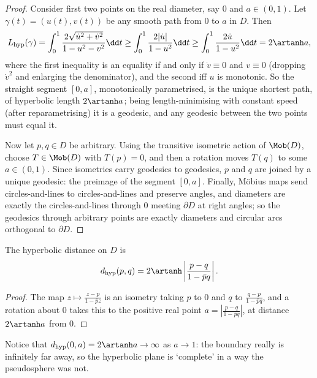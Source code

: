 \begin{proof}
    Consider first two points on the real diameter, say $0$ and $a \in (0, 1)$. Let $\gamma(t) = (u(t), v(t))$ be any smooth path from $0$ to $a$ in $D$. Then
    \begin{align*}
    L_{\mathrm{hyp}}(\gamma) = \int_0^1 \frac{2\sqrt{\dot u^2 + \dot v^2}}{1 - u^2 - v^2} \dd t \geq \int_0^1 \frac{2 |\dot u|}{1 - u^2} \dd t \geq \int_0^1 \frac{2 \dot u}{1 - u^2} \dd t = 2 \artanh a,
    \end{align*}
    where the first inequality is an equality if and only if $\dot v \equiv 0$ and $v \equiv 0$ (dropping $\dot v^2$ and enlarging the denominator), and the second iff $u$ is monotonic. So the straight segment $[0, a]$, monotonically parametrised, is the unique shortest path, of hyperbolic length $2 \artanh a$; being length-minimising with constant speed (after reparametrising) it is a geodesic, and any geodesic between the two points must equal it.

    Now let $p, q \in D$ be arbitrary. Using the transitive isometric action of $\Mob(D)$, choose $T \in \Mob(D)$ with $T(p) = 0$, and then a rotation moves $T(q)$ to some $a \in (0, 1)$. Since isometries carry geodesics to geodesics, $p$ and $q$ are joined by a unique geodesic: the preimage of the segment $[0, a]$. Finally, M\"obius maps send circles-and-lines to circles-and-lines and preserve angles, and diameters are exactly the circles-and-lines through $0$ meeting $\partial D$ at right angles; so the geodesics through arbitrary points are exactly diameters and circular arcs orthogonal to $\partial D$.
\end{proof}

\begin{corollary}
    The hyperbolic distance on $D$ is
    $$
    d_{\mathrm{hyp}}(p, q) = 2 \artanh \left|\frac{p - q}{1 - \bar p q}\right|.
    $$
\end{corollary}
\begin{proof}
    The map $z \mapsto \frac{z - p}{1 - \bar p z}$ is an isometry taking $p$ to $0$ and $q$ to $\frac{q - p}{1 - \bar p q}$, and a rotation about $0$ takes this to the positive real point $a = \left|\frac{p - q}{1 - \bar p q}\right|$, at distance $2\artanh a$ from $0$.
\end{proof}

Notice that $d_{\mathrm{hyp}}(0, a) = 2 \artanh a \rightarrow \infty$ as $a \rightarrow 1$: the boundary really is infinitely far away, so the hyperbolic plane is `complete' in a way the pseudosphere was not.

